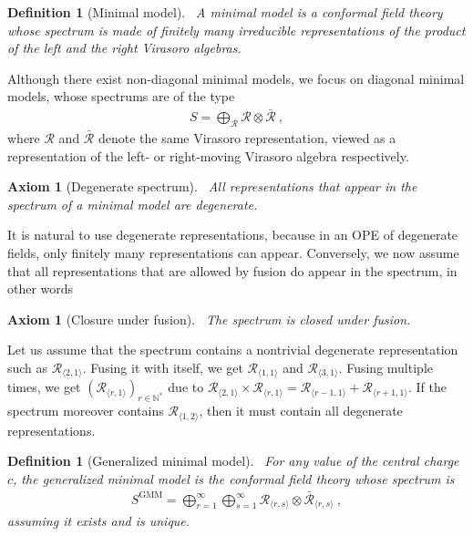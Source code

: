 \documentclass[12pt, a4paper]{article}
\theoremstyle{break}
\newtheorem{hyp}[exo]{Axiom}
\newtheorem{defn}[exo]{Definition}
\begin{document}
\begin{defn}[Minimal model]
 ~\label{def:mm}
 A minimal model is a conformal field theory whose spectrum is made of finitely many irreducible representations of the product of the left and the right Virasoro algebras.
\end{defn}

Although there exist non-diagonal minimal models, we focus on diagonal minimal models, whose spectrums are of the type
\begin{align}
 S = \bigoplus_\mathcal{R} \mathcal{R}\otimes  \mathcal{\bar R}\ ,
\end{align}
where $\mathcal{R}$ and $ \mathcal{\bar R}$ denote the same Virasoro representation, viewed as a representation of the left- or right-moving Virasoro algebra respectively.

\begin{hyp}[Degenerate spectrum]
 ~\label{hyp:deg}
 All representations that appear in the spectrum of a minimal model are degenerate.
\end{hyp}

It is natural to use degenerate representations, because in an OPE of degenerate fields, only finitely many representations can appear. Conversely, we now assume that all representations that are allowed by fusion do appear in the spectrum, in other words

\begin{hyp}[Closure under fusion]
 ~\label{hyp:stab}
 The spectrum is closed under fusion. 
\end{hyp}

Let us assume that the spectrum contains a nontrivial degenerate representation such as $\mathcal{R}_{\langle 2,1\rangle}$. Fusing it with itself, we get $\mathcal{R}_{\langle 1, 1\rangle}$ and $\mathcal{R}_{\langle 3,1\rangle}$. Fusing multiple times, we get $(\mathcal{R}_{\langle r, 1\rangle})_{r\in\mathbb{N}^*}$ due to $\mathcal{R}_{\langle 2,1\rangle} \times \mathcal{R}_{\langle r,1\rangle} = \mathcal{R}_{\langle r-1,1\rangle}  + \mathcal{R}_{\langle r+1,1\rangle}$. If the spectrum moreover contains $\mathcal{R}_{\langle 1,2\rangle}$, then it must contain all degenerate representations. 

\begin{defn}[Generalized minimal model]
 ~\label{def:gmm}
 For any value of the central charge $c$, the generalized minimal model is the conformal field theory whose spectrum is
 \begin{align}
  S^\mathrm{GMM} = \bigoplus_{r=1}^\infty \bigoplus_{s=1}^\infty \mathcal{R}_{\langle r,s \rangle}\otimes  \mathcal{\bar R}_{\langle r,s \rangle} \ ,
 \end{align}
 assuming it exists and is unique.
\end{defn}
\end{document}
